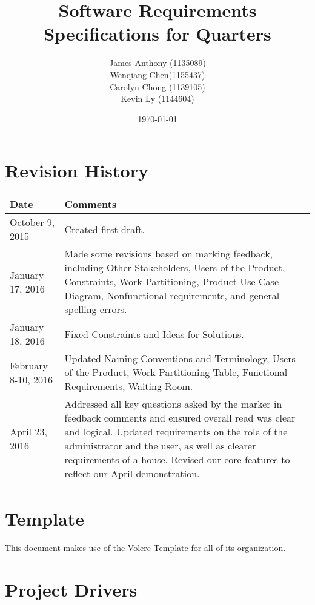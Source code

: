 \documentclass[12pt]{article}
\begin{document}
\title{Software Requirements Specifications for Quarters} 
\author{James Anthony (1135089)\\ Wenqiang Chen(1155437)\\ Carolyn Chong 
(1139105)\\ Kevin Ly (1144604)}
\date{\today}
\maketitle

\pagebreak

\tableofcontents 
\listoffigures
\listoftables

\section*{Revision History}
\begin{longtable}{|p{5cm}|p{10cm}|}
\hline
\textbf{Date}  & \textbf{Comments} \\ \hline
October 9, 2015 & Created first draft. \\ 
\hline
January 17, 2016 & Made some revisions based on marking feedback, including Other Stakeholders, Users of the Product, Constraints, Work Partitioning, Product Use Case Diagram, Nonfunctional requirements, and general spelling errors. \\ 
\hline
January 18, 2016 & Fixed Constraints and Ideas for Solutions. \\ 
\hline
February 8-10, 2016 & Updated Naming Conventions and Terminology, Users of the Product, Work Partitioning Table, Functional Requirements, Waiting Room. \\ 
\hline
April 23, 2016 & Addressed all key questions asked by the marker in feedback comments and ensured overall read was clear and logical. Updated requirements on the role of the administrator and the user, as well as clearer requirements of a house. Revised our core features to reflect our April demonstration.  \\ 
\hline
\end{longtable}

\section*{Template}
This document makes use of the Volere Template for all of its organization.

\pagebreak

\section{Project Drivers}
\end{document}

